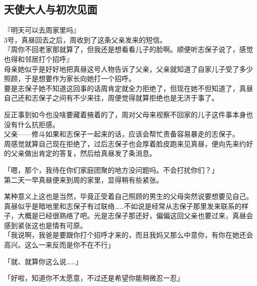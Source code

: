 \subsection{天使大人与初次见面}

『明天可以去周家里吗』\\

3号，真昼回去之后，周收到了这条父亲发来的短信。\\

『周你不回老家那就算了，但我还是想看看儿子的脸啊。顺便听志保子说了，感觉也得和邻居打个招呼』\\

母亲她似乎是好好地把真昼这号人物告诉了父亲，父亲就知道了自家儿子受了多少照顾，于是想要作为家长向她打一个招呼。\\

要是志保子她不知道这回事的话周肯定就全力拒绝了，但现在她不但知道了，真昼自己还和志保子之间有不少来往，周便觉得就算拒绝也是无济于事了。

反正事到如今也没啥要藏着掖着的了，周对父母来视察不回家的儿子这件事本身也没有什么抗拒感。\\

父亲——修斗如果和志保子一起来的话，应该会帮忙责备容易暴走的志保子。\\

周感觉就算自己现在拒绝了，过后志保子也会厚着脸皮跑来见真昼，便向先来约好的父亲做出肯定的答复，然后给真昼发了条消息。\\

\vspace{2\baselineskip}

「嗯，那个，我待在你们家庭团聚的地方没问题吗。不会打扰你们？」\\

第二天一早真昼便来到周的家里，显得稍有些紧张。

某种意义上这也是当然，毕竟正受着自己照顾的男生的父母突然说要想要见自己。\\

真昼似乎是暗地里和志保子有过联络……不如说是经常从志保子那里发来联系的样子，大概是已经很熟络了吧。光是志保子那还好，偏偏这回父亲也要过来，真昼会感到紧张这也是情有可原。\\

「我说啊，我爸是要跟你打个招呼才来的，而且我妈又那么中意你，有你在她还会高兴。这么一来反而是你不在不行」

「就、就算你这么说……」

「好啦，知道你不太愿意，不过还是希望你能稍微忍一忍」\\

